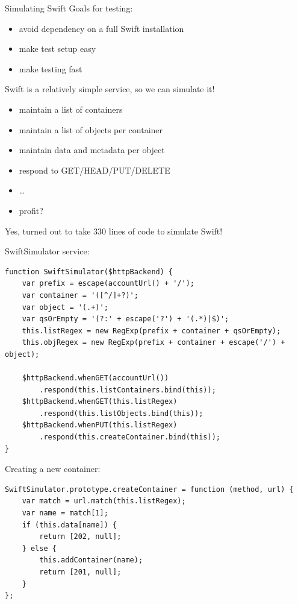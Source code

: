\documentclass[t,noamsthm]{beamer}
\begin{document}
\begin{frame}{Simulating Swift}
  Goals for testing:
  \begin{itemize}
  \item avoid dependency on a full Swift installation
  \item make test setup easy
  \item make testing fast
  \end{itemize}

  \framebreak

  Swift is a relatively simple service, so we can simulate it!
  \begin{itemize}
  \item maintain a list of containers
  \item maintain a list of objects per container
  \item maintain data and metadata per object
  \item respond to GET/HEAD/PUT/DELETE
  \item \dots
  \item profit?
  \end{itemize}


  Yes, turned out to take 330 lines of code to simulate Swift!

  \framebreak

  SwiftSimulator service:
\begin{lstlisting}
function SwiftSimulator($httpBackend) {
    var prefix = escape(accountUrl() + '/');
    var container = '([^/]+?)';
    var object = '(.+)';
    var qsOrEmpty = '(?:' + escape('?') + '(.*)|$)';
    this.listRegex = new RegExp(prefix + container + qsOrEmpty);
    this.objRegex = new RegExp(prefix + container + escape('/') + object);

    $httpBackend.whenGET(accountUrl())
        .respond(this.listContainers.bind(this));
    $httpBackend.whenGET(this.listRegex)
        .respond(this.listObjects.bind(this));
    $httpBackend.whenPUT(this.listRegex)
        .respond(this.createContainer.bind(this));
}
\end{lstlisting}

\framebreak

Creating a new container:
\begin{lstlisting}
SwiftSimulator.prototype.createContainer = function (method, url) {
    var match = url.match(this.listRegex);
    var name = match[1];
    if (this.data[name]) {
        return [202, null];
    } else {
        this.addContainer(name);
        return [201, null];
    }
};
\end{lstlisting}


\end{frame}
\end{document}
